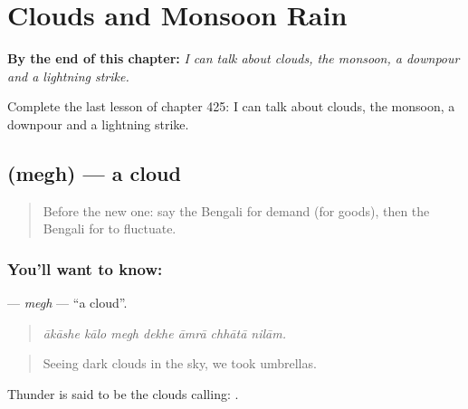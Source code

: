 
\chapter{Clouds and Monsoon Rain}
\label{ch:bn-clouds-and-monsoon-rain}

\begin{chapteropening}
\textbf{By the end of this chapter:} \emph{I can talk about clouds, the monsoon, a downpour and a lightning strike.}

Complete the last lesson of chapter 425: I can talk about clouds, the monsoon, a downpour and a lightning strike.
\end{chapteropening}

\section[\texorpdfstring{\bn{মেঘ} (megh)}{মেঘ (megh)}]{ (megh) — a cloud}

\label{lesson:BN-C425-megh}



\begin{quote}
Before the new one: say the Bengali for demand (for goods), then the Bengali for to fluctuate.
\end{quote}

\subsection*{You'll want to know: }
\textbf{} — \emph{megh} — \textquotedblleft{}a cloud\textquotedblright{}.

\begin{quote}
      
\end{quote}

\begin{quote}
\emph{ākāshe kālo megh dekhe āmrā chhātā nilām.}
\end{quote}

\begin{quote}
Seeing dark clouds in the sky, we took umbrellas.
\end{quote}

Thunder is said to be the clouds calling:  .

